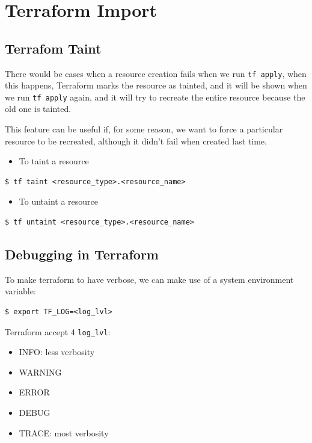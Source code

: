 \documentclass{article}
\newenvironment{codetemplate}[1][]{%
  \mybasecolorbox[#1]
  \itshape
}{%
  \endmybasecolorbox
}
\begin{document}
\section{Terraform Import}

\subsection{Terrafom Taint}
There would be cases when a resource creation fails when we run \verb|tf apply|, when this happens, Terraform marks the resource as tainted, and it will be shown when we run \verb|tf apply| again, and it will try to recreate the entire resource because the old one is tainted.

This feature can be useful if, for some reason, we want to force a particular resource to be recreated, although it didn't fail when created last time. 

\begin{itemize}
    \item To taint a resource
\end{itemize}
\begin{codetemplate}{}
\begin{verbatim}
$ tf taint <resource_type>.<resource_name>
\end{verbatim}
\end{codetemplate}
\begin{itemize}
    \item To untaint a resource
\end{itemize}
\begin{codetemplate}{}
\begin{verbatim}
$ tf untaint <resource_type>.<resource_name>
\end{verbatim}
\end{codetemplate}

\subsection{Debugging in Terraform}
To make terraform to have verbose, we can make use of a system environment variable:
\begin{codetemplate}{}
\begin{verbatim}
$ export TF_LOG=<log_lvl>
\end{verbatim}
\end{codetemplate}

Terraform accept 4 \verb|log_lvl|:
\begin{itemize}
    \item INFO: less verbosity
    \item WARNING
    \item ERROR
    \item DEBUG
    \item TRACE: most verbosity
\end{itemize}
\end{document}

